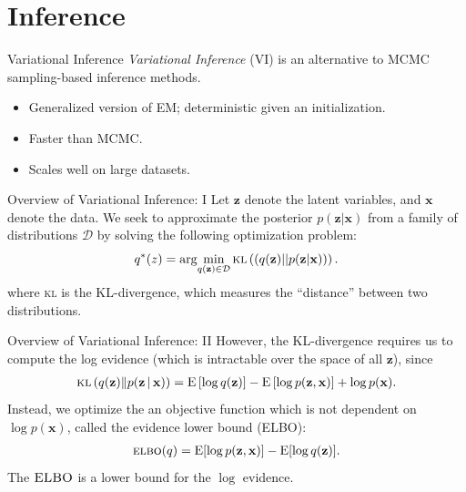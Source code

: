 \documentclass{beamer}
\newcommand{\bx}{\ensuremath{\mathbf{x}}}
\newcommand{\bz}{\ensuremath{\mathbf{z}}}
\newcommand{\kl}[1]{\textsc{kl}\left(#1\right)}
\newcommand{\g}{\,\vert\,}
\newcommand{\E}{\mathrm{E}}
\newcommand{\ELBO}{\textsc{elbo}}
\begin{document}

\section{Inference}

\begin{frame}{Variational Inference}
\emph{Variational Inference} (VI) is an alternative to MCMC sampling-based inference methods.
\vspace{0.05in}
\begin{itemize}
	\item<2-> Generalized version of EM; deterministic given an initialization.
	\item<3-> Faster than MCMC.
	\item<4-> Scales well on large datasets.
\end{itemize}
\end{frame}

\begin{frame}{Overview of Variational Inference: I}
Let $\mathbf{z}$ denote the latent variables, and $\mathbf{x}$ denote the data. We seek to approximate the posterior $p(\mathbf{z}|\mathbf{x})$ from a family of distributions $\mathcal{D}$ by solving the following optimization problem: 
\begin{equation*} \label{eq:optimalq}
q^*(z) = \arg\!\min_{q(\mathbf{z}) \in \mathcal{D}} \kl{(q(\mathbf{z}) || p(\mathbf{z}|\mathbf{x}))}.
\end{equation*}
where \textsc{kl} is the KL-divergence, which measures the ``distance'' between two distributions. 
\end{frame}

\begin{frame}{Overview of Variational Inference: II}
However, the KL-divergence requires us to compute the log evidence (which is intractable over the space of all $\mathbf{z}$), since
\begin{align*}
  \kl{q(\bz) \| p(\bz \g \bx)} =
  \E\left[\log q(\bz)\right] -
  \E\left[\log p(\bz, \bx)\right] +
  \log p(\bx). 
\end{align*}
\pause
Instead, we optimize the an objective function which is not dependent on $\log p(\bx)$, called the evidence lower bound (\textsc{ELBO}):
\begin{align*}
  \ELBO(q) =
  \E{[\log p(\bz, \bx)]} -
  \E{[\log q(\bz)]}.
\end{align*}
The $\textsc{ELBO}$ is a lower bound for the $\log$ evidence. 
\end{frame}
\end{document}
